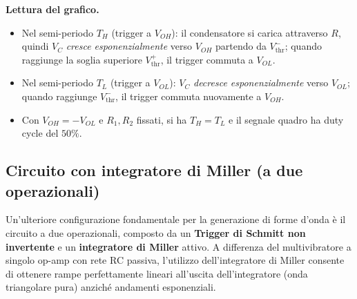 \textbf{Lettura del grafico.}
\begin{itemize}
    \item Nel semi-periodo $T_H$ (trigger a $V_{OH}$): il condensatore si carica attraverso $R$, quindi $V_C$ \emph{cresce esponenzialmente} verso $V_{OH}$ partendo da $V_{\text{thr}}^-$; quando raggiunge la soglia superiore $V_{\text{thr}}^+$, il trigger commuta a $V_{OL}$.
    \item Nel semi-periodo $T_L$ (trigger a $V_{OL}$): $V_C$ \emph{decresce esponenzialmente} verso $V_{OL}$; quando raggiunge $V_{\text{thr}}^-$, il trigger commuta nuovamente a $V_{OH}$.
    \item Con $V_{OH} = -V_{OL}$ e $R_1, R_2$ fissati, si ha $T_H = T_L$ e il segnale quadro ha duty cycle del $50\%$.
\end{itemize}

\subsection{Circuito con integratore di Miller (a due operazionali)}

Un'ulteriore configurazione fondamentale per la generazione di forme d'onda è il circuito a due operazionali, composto da un \textbf{Trigger di Schmitt non invertente} e un \textbf{integratore di Miller} attivo. A differenza del multivibratore a singolo op-amp con rete RC passiva, l'utilizzo dell'integratore di Miller consente di ottenere rampe perfettamente lineari all'uscita dell'integratore (onda triangolare pura) anziché andamenti esponenziali.

